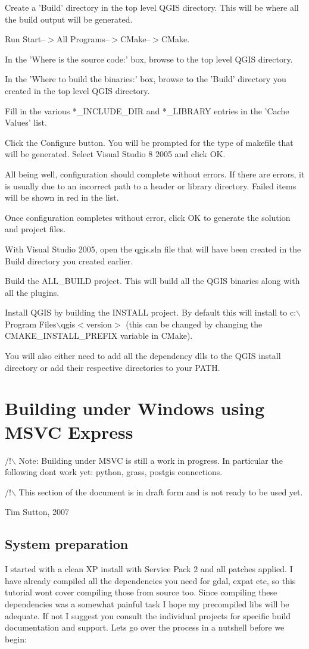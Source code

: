 Create a 'Build' directory in the top level QGIS directory. This will be where all the build output will be generated.

Run Start--$>$All Programs--$>$CMake--$>$CMake. 

In the 'Where is the source code:' box, browse to the top level QGIS directory.

In the 'Where to build the binaries:' box, browse to the 'Build' directory you created in the top level QGIS directory.

Fill in the various *\_INCLUDE\_DIR and *\_LIBRARY entries in the 'Cache Values' list.

Click the Configure button. You will be prompted for the type of makefile that will be generated. Select Visual Studio 8 2005 and click OK.

All being well, configuration should complete without errors. If there are errors, it is usually due to an incorrect path to a header or library directory. Failed items will be shown in red in the list.

Once configuration completes without error, click OK to generate the solution and project files.

With Visual Studio 2005, open the qgis.sln file that will have been created in the Build directory you created earlier.

Build the ALL\_BUILD project. This will build all the QGIS binaries along with all the plugins.

 Install QGIS by building the INSTALL project. By default this will install to c:$\backslash$Program Files$\backslash$qgis$<$version$>$ (this can be changed by changing the CMAKE\_INSTALL\_PREFIX variable in CMake). 

 You will also either need to add all the dependency dlls to the QGIS install directory or add their respective directories to your PATH.


\section{Building under Windows using MSVC Express}
/!$\backslash$ Note: Building under MSVC is still a work in progress. In particular the
following dont work yet: python, grass, postgis connections.

/!$\backslash$ This section of the document is in draft form and is not ready to be used
yet.

Tim Sutton, 2007

\subsection{System preparation}
I started with a clean XP install with Service Pack 2 and all patches applied.
I have already compiled all the dependencies you need for gdal, expat etc,
so this tutorial wont cover compiling those from source too. Since compiling 
these dependencies was a somewhat painful task I hope my precompiled libs 
will be adequate. If not I suggest you consult the individual projects for
specific build documentation and support. Lets go over the process in a nutshell 
before we begin:

